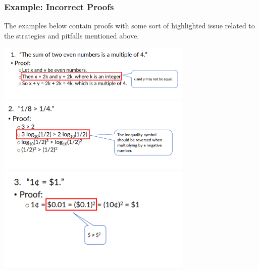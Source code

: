 \documentclass[12pt, letterpaper]{article}
\begin{document}
\pagebreak

\subsubsection*{Example: Incorrect Proofs}
The examples below contain proofs with some sort of highlighted issue related to the strategies and pitfalls mentioned above.
\bigbreak
\begin{center}
	\includegraphics[width=0.7\textwidth]{images/wrongproof-1.png} \\
	\includegraphics[width=0.7\textwidth]{images/wrongproof-2.png} \\
	\includegraphics[width=0.7\textwidth]{images/wrongproof-3.png} \\
\end{center}

\pagebreak
\end{document}
